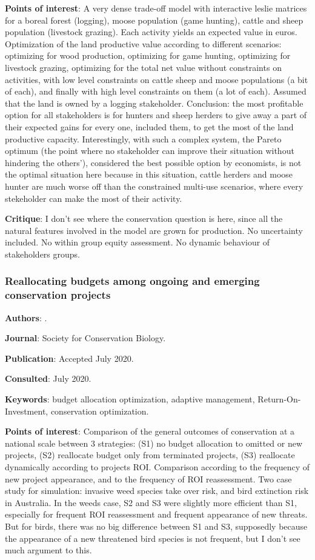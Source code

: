 \documentclass[12pt,a4paper]{article}
\begin{document}
\textbf{Points of interest}: A very dense trade-off model with interactive leslie matrices for a boreal forest (logging), moose population (game hunting), cattle and sheep population (livestock grazing). Each activity yields an expected value in euros. Optimization of the land productive value according to different scenarios: optimizing for wood production, optimizing for game hunting, optimizing for livestock grazing, optimizing for the total net value without constraints on activities, with low level constraints on cattle sheep and moose populations (a bit of each), and finally with high level constraints on them (a lot of each). Assumed that the land is owned by a logging stakeholder. Conclusion: the most profitable option for all stakeholders is for hunters and sheep herders to give away a part of their expected gains for every one, included them, to get the most of the land productive capacity. Interestingly, with such a complex system, the Pareto optimum (the point where no stakeholder can improve their situation without hindering the others'), considered the best possible option by economists, is not the optimal situation here because in this situation, cattle herders and moose hunter are much worse off than the constrained multi-use scenarios, where every stekeholder can make the most of their activity.

\textbf{Critique}: I don't see where the conservation question is here, since all the natural features involved in the model are grown for production. No uncertainty included. No within group equity assessment. No dynamic behaviour of stakeholders groups.

\newpage

\subsubsection*{Reallocating budgets among ongoing and emerging conservation projects}

\textbf{Authors}: \cite{wu2020reallocating}.

\textbf{Journal}: Society for Conservation Biology.

\textbf{Publication}: Accepted July 2020.

\textbf{Consulted}: July 2020.

\textbf{Keywords}: budget allocation optimization, adaptive management, Return-On-Investment, conservation optimization.

\textbf{Points of interest}: Comparison of the general outcomes of conservation at a national scale between 3 strategies: (S1) no budget allocation to omitted or new projects, (S2) reallocate budget only from terminated projects, (S3) reallocate dynamically according to projects ROI. Comparison according to the frequency of new project appearance, and to the frequency of ROI reassessment. Two case study for simulation: invasive weed species take over risk, and bird extinction risk in Australia. In the weeds case, S2 and S3 were slightly more efficient than S1, especially for frequent ROI reassessment and frequent appearance of new threats. But for birds, there was no big difference between S1 and S3, supposedly because the appearance of a new threatened bird species is not frequent, but I don't see much argument to this.
\end{document}
